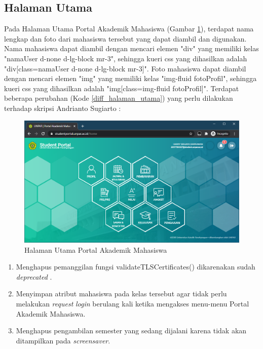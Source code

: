 \subsection{Halaman Utama}
Pada Halaman Utama Portal Akademik Mahasiswa (Gambar \ref{fig:3_home}), terdapat nama lengkap dan foto dari mahasiswa tersebut yang dapat diambil dan digunakan. Nama mahasiswa dapat diambil dengan mencari elemen "div" yang memiliki kelas "namaUser d-none d-lg-block mr-3", sehingga kueri css yang dihasilkan adalah "div[class=namaUser d-none d-lg-block mr-3]". Foto mahasiswa dapat diambil dengan mencari elemen "img" yang memiliki kelas "img-fluid fotoProfil", sehingga kueri css yang dihasilkan adalah "img[class=img-fluid fotoProfil]".
Terdapat beberapa perubahan (Kode \ref{diff_halaman_utama}) yang perlu dilakukan terhadap skripsi Andrianto Sugiarto \cite{ifstupor}:

\begin{figure}[H]
	\centering
	\includegraphics[scale=0.5]{Gambar/home.png}
	\caption{Halaman Utama Portal Akademik Mahasiswa} 
	\label{fig:3_home}
\end{figure}

\begin{enumerate}
    \item Menghapus pemanggilan fungsi validateTLSCertificates() dikarenakan sudah \textit{deprecated} \cite{jsoup}.
    \item Menyimpan atribut mahasiswa pada kelas tersebut agar tidak perlu melakukan \textit{request} \textit{login} berulang kali ketika mengakses menu-menu Portal Akademik Mahasiswa.
    \item Menghapus pengambilan semester yang sedang dijalani karena tidak akan ditampilkan pada \textit{screensaver}.
\end{enumerate}


